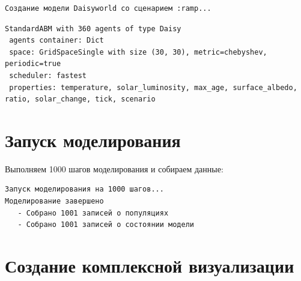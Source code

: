 \documentclass[
  12pt,
  a4paper,
  DIV=11,
  numbers=noendperiod]{scrreprt}
\newenvironment{Shaded}{\begin{snugshade}}{\end{snugshade}}
\newcommand{\FloatTok}[1]{\textcolor[rgb]{0.68,0.00,0.00}{#1}}
\newcommand{\FunctionTok}[1]{\textcolor[rgb]{0.28,0.35,0.67}{#1}}
\newcommand{\NormalTok}[1]{\textcolor[rgb]{0.00,0.23,0.31}{#1}}
\newcommand{\OperatorTok}[1]{\textcolor[rgb]{0.37,0.37,0.37}{#1}}
\newcommand{\SpecialCharTok}[1]{\textcolor[rgb]{0.37,0.37,0.37}{#1}}
\newcommand{\StringTok}[1]{\textcolor[rgb]{0.13,0.47,0.30}{#1}}
\begin{document}
\begin{verbatim}
Создание модели Daisyworld со сценарием :ramp...
\end{verbatim}

\begin{verbatim}
StandardABM with 360 agents of type Daisy
 agents container: Dict
 space: GridSpaceSingle with size (30, 30), metric=chebyshev, periodic=true
 scheduler: fastest
 properties: temperature, solar_luminosity, max_age, surface_albedo, ratio, solar_change, tick, scenario
\end{verbatim}

\section{Запуск
моделирования}\label{ux437ux430ux43fux443ux441ux43a-ux43cux43eux434ux435ux43bux438ux440ux43eux432ux430ux43dux438ux44f-1}

Выполняем 1000 шагов моделирования и собираем данные:

\begin{Shaded}
\end{Shaded}

\begin{verbatim}
Запуск моделирования на 1000 шагов...
Моделирование завершено
   - Собрано 1001 записей о популяциях
   - Собрано 1001 записей о состоянии модели
\end{verbatim}

\section{Создание комплексной
визуализации}\label{ux441ux43eux437ux434ux430ux43dux438ux435-ux43aux43eux43cux43fux43bux435ux43aux441ux43dux43eux439-ux432ux438ux437ux443ux430ux43bux438ux437ux430ux446ux438ux438}
\end{document}

